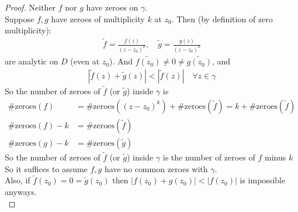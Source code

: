 \begin{proof}
    Neither $f$ nor $g$ have zeroes on $\gamma$.\\
    Suppose $f,g$ have zeroes of multiplicity $k$ at $z_0$. Then (by definition of zero multiplicity):
    \begin{align*}
        \tilde{f} = \frac{f(z)}{(z-z_0)^k}, \quad \tilde{g} = \frac{g(z)}{(z-z_0)^k}
    \end{align*}
    are analytic on $D$ (even at $z_0$). And $\tilde{f(z_0)} \neq 0 \neq \tilde{g(z_0)}$, and
    \begin{align*}
        |\tilde{f}(z) + \tilde{g}(z)| < |\tilde{f}(z)| \quad \forall z \in \gamma
    \end{align*}
    So the number of zeroes of $\tilde{f}$ (or $\tilde{g}$) inside $\gamma$ is
    \begin{align}
        \text{\#zeroes}(f)     & = \text{\#zeroes}((z-z_0)^k) + \text{\#zeroes}(\tilde{f}) = k + \text{\#zeroes}(\tilde{f}) \\
        \text{\#zeroes}(f) - k & = \text{\#zeroes}(\tilde{f})                                                               \\
        \text{\#zeroes}(g) - k & = \text{\#zeroes}(\tilde{g})
    \end{align}
    So the number of zeroes of $\tilde{f}$ (or $\tilde{g}$) inside $\gamma$ is the number of zeroes of $f$ minus $k$
    So it suffices to assume $f,g$ have no common zeroes with $\gamma$.\\
    Also, if $\tilde{f}(z_0) = 0 = \tilde{g}(z_0)$ then $|f(z_0) + g(z_0)| < |f(z_0)|$ is impossible anyways.\\
\end{proof}

